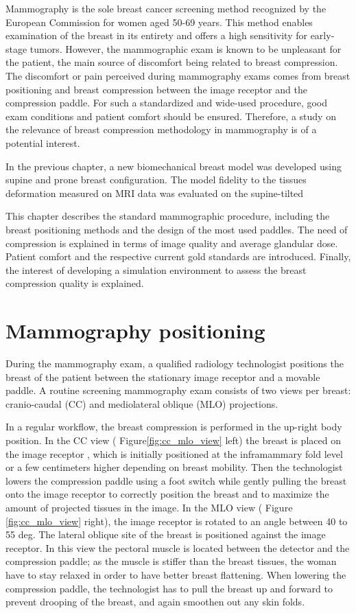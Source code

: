 

Mammography is the sole breast cancer screening method recognized by the European Commission for women aged 50-69 years. This method enables examination of the breast in its entirety and offers a high sensitivity for early-stage tumors. However, the mammographic exam is known to be unpleasant for the patient, the main source of discomfort being related to breast compression. The discomfort or pain perceived during mammography exams comes from breast positioning and breast compression between the image receptor and the compression paddle. For such a standardized and wide-used procedure, good exam conditions and patient comfort should be ensured. Therefore, a study on the relevance of breast compression methodology in mammography is of a potential interest.

In the previous chapter, a new biomechanical breast model was developed using supine and prone breast configuration. The model fidelity to the tissues deformation measured on MRI data was evaluated on the supine-tilted 

 This chapter describes the standard mammographic procedure, including the breast positioning methods and the design of the most used paddles. The need of compression is explained in terms of image quality and average glandular dose. Patient comfort and the respective current gold standards are introduced. Finally, the interest of developing a simulation environment to assess the breast compression quality is explained.

\clearpage
\section{Mammography positioning} \label{subsec:mammographicpositioning}

During the mammography exam, a qualified radiology technologist positions the breast of the patient between the stationary image receptor and a movable paddle. A routine screening mammography exam consists of two views per breast: cranio-caudal (CC) and mediolateral oblique (MLO) projections.  

In a regular workflow, the breast compression is performed in the up-right body position. In the CC view ( Figure\ref{fig:cc_mlo_view} left) the breast is placed on the image receptor , which is initially positioned at the inframammary fold level or a few centimeters higher depending on breast mobility. Then the technologist lowers the compression paddle using a foot switch while gently pulling the breast onto the image receptor to correctly position the breast and to maximize the amount of projected tissues in the image. In the MLO view ( Figure \ref{fig:cc_mlo_view} right), the image receptor is rotated to an angle between 40 to 55 deg. The lateral oblique site of the breast is positioned against the image receptor. In this view the pectoral muscle is located between the detector and the compression paddle; as the muscle is stiffer than the breast tissues, the woman have to stay relaxed in order to have better breast flattening. When lowering the compression paddle, the technologist has to pull the breast up and forward to prevent drooping of the breast, and again smoothen out any skin folds. 


